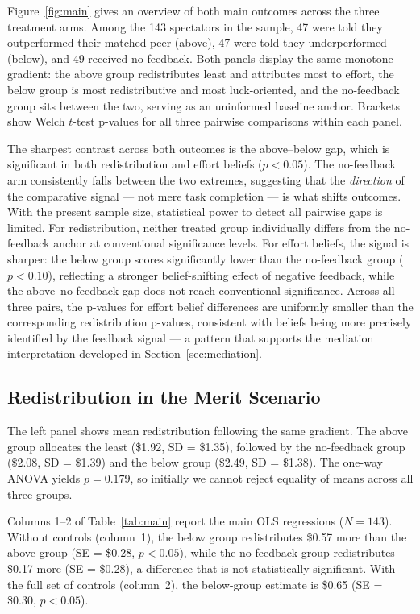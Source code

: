 \documentclass[12pt]{article}
\begin{document}
Figure~\ref{fig:main} gives an overview of both main outcomes across
the three treatment arms.
Among the 143 spectators in the sample, 47 were told they outperformed their
matched peer (above), 47 were told they underperformed (below), and 49
received no feedback.
Both panels display the same monotone gradient: the above group redistributes
least and attributes most to effort, the below group is most redistributive
and most luck-oriented, and the no-feedback group sits between the two,
serving as an uninformed baseline anchor.
Brackets show Welch $t$-test p-values for all three pairwise comparisons
within each panel.

The sharpest contrast across both outcomes is the above--below gap,
which is significant in both redistribution and effort beliefs ($p < 0.05$).
The no-feedback arm consistently falls between the two extremes, suggesting
that the \emph{direction} of the comparative signal --- not mere task
completion --- is what shifts outcomes.
With the present sample size, statistical power to detect all pairwise gaps
is limited.
For redistribution, neither treated group individually differs from the
no-feedback anchor at conventional significance levels.
For effort beliefs, the signal is sharper: the below group scores
significantly lower than the no-feedback group ($p < 0.10$), reflecting a
stronger belief-shifting effect of negative feedback, while the
above--no-feedback gap does not reach conventional significance.
Across all three pairs, the p-values for effort belief differences are
uniformly smaller than the corresponding redistribution p-values,
consistent with beliefs being more precisely identified by the feedback signal
--- a pattern that supports the mediation interpretation developed in
Section~\ref{sec:mediation}.

\subsection{Redistribution in the Merit Scenario}
\label{sec:merit}

The left panel shows mean redistribution following the same gradient.
The above group allocates the least (\$1.92, SD = \$1.35), followed by
the no-feedback group (\$2.08, SD = \$1.39) and the below group
(\$2.49, SD = \$1.38). The one-way ANOVA yields $p = 0.179$, so initially
we cannot reject equality of means across all three groups.

Columns 1--2 of Table~\ref{tab:main} report the main OLS regressions
($N = 143$).
Without controls (column~1), the below group redistributes \$0.57 more
than the above group (SE = \$0.28, $p < 0.05$), while the no-feedback
group redistributes \$0.17 more (SE = \$0.28), a difference that is not
statistically significant.
With the full set of controls (column~2), the below-group estimate is
\$0.65 (SE = \$0.30, $p < 0.05$).
\end{document}
